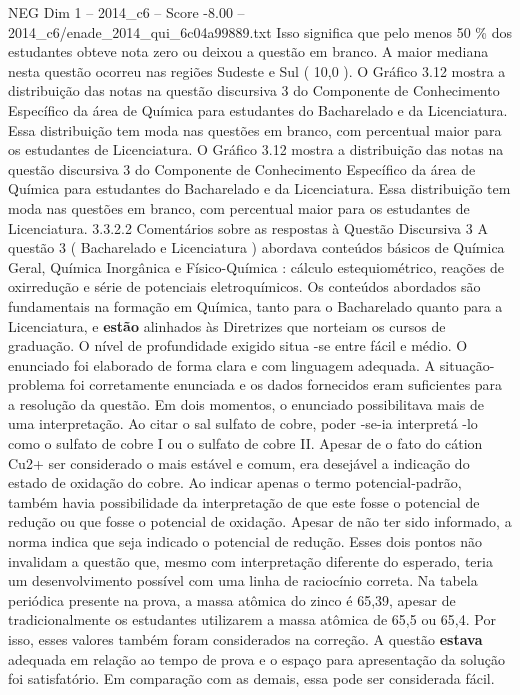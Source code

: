 \begin{textsample}{NEG Dim 1 – 2014\_c6 – Score -8.00 – 2014\_c6/enade\_2014\_qui\_6c04a99889.txt}
Isso significa que pelo menos 50 \% dos estudantes obteve nota zero ou deixou a questão em branco.
A maior mediana nesta questão ocorreu nas regiões Sudeste e Sul ( 10,0 ).
O Gráfico 3.12 mostra a distribuição das notas na questão discursiva 3 do Componente de Conhecimento Específico da área de Química para estudantes do Bacharelado e da Licenciatura.
Essa distribuição tem moda nas questões em branco, com percentual maior para os estudantes de Licenciatura.
O Gráfico 3.12 mostra a distribuição das notas na questão discursiva 3 do Componente de Conhecimento Específico da área de Química para estudantes do Bacharelado e da Licenciatura.
Essa distribuição tem moda nas questões em branco, com percentual maior para os estudantes de Licenciatura. 3.3.2.2 Comentários sobre as respostas à Questão Discursiva 3 A questão 3 ( Bacharelado e Licenciatura ) abordava conteúdos básicos de Química Geral, Química Inorgânica e Físico-Química : cálculo estequiométrico, reações de oxirredução e série de potenciais eletroquímicos.
Os conteúdos abordados são fundamentais na formação em Química, tanto para o Bacharelado quanto para a Licenciatura, e \textbf{estão} alinhados às Diretrizes que norteiam os cursos de graduação.
O nível de profundidade exigido situa -se entre fácil e médio.
O enunciado foi elaborado de forma clara e com linguagem adequada.
A situação-problema foi corretamente enunciada e os dados fornecidos eram suficientes para a resolução da questão.
Em dois momentos, o enunciado possibilitava mais de uma interpretação.
Ao citar o sal sulfato de cobre, poder -se-ia interpretá -lo como o sulfato de cobre I ou o sulfato de cobre II.
Apesar de o fato do cátion Cu2+ ser considerado o mais estável e comum, era desejável a indicação do estado de oxidação do cobre.
Ao indicar apenas o termo potencial-padrão, também havia possibilidade da interpretação de que este fosse o potencial de redução ou que fosse o potencial de oxidação.
Apesar de não ter sido informado, a norma indica que seja indicado o potencial de redução.
Esses dois pontos não invalidam a questão que, mesmo com interpretação diferente do esperado, teria um desenvolvimento possível com uma linha de raciocínio correta.
Na tabela periódica presente na prova, a massa atômica do zinco é 65,39, apesar de tradicionalmente os estudantes utilizarem a massa atômica de 65,5 ou 65,4.
Por isso, esses valores também foram considerados na correção.
A questão \textbf{estava} adequada em relação ao tempo de prova e o espaço para apresentação da solução foi satisfatório.
Em comparação com as demais, essa pode ser considerada fácil.

\end{textsample}
